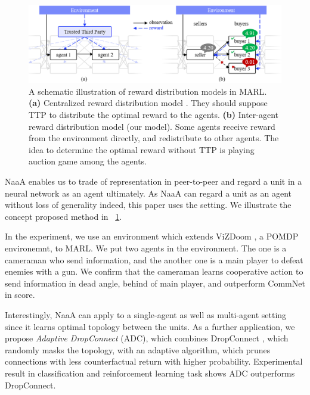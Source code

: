 \begin{figure}[tb]
	\centering
	\includegraphics[width=\linewidth]{img/TTP.eps}
	\caption{
		A schematic illustration of reward distribution models in MARL.
		{\bf (a)} Centralized reward distribution model \citep{agogino2006quicr,sukhbaatar2016learning,foerster2016learning,foerster2017counterfactual}. They should suppose TTP to distribute the optimal reward to the agents. %
		{\bf (b)} Inter-agent reward distribution model (our model). Some agents receive reward from the environment directly, and redistribute to other agents. The idea to determine the optimal reward without TTP is playing auction game among the agents.
	}
	\label{fig:ttp}
\end{figure}

NaaA enables us to trade of representation in peer-to-peer and regard a unit in a neural network as an agent ultimately.
As NaaA can regard a unit as an agent without loss of generality indeed, this paper uses the setting.
We illustrate the concept proposed method in \figurename~\ref{fig:ttp}.

In the experiment, we use an environment which extends ViZDoom \citep{kempka2016vizdoom}, a POMDP environemnt, to MARL.
We put two agents in the environment.
The one is a cameraman who send information, and the another one is a main player to defeat enemies with a gun.
We confirm that the cameraman learns cooperative action to send information in dead angle, behind of main player, and outperform CommNet in score.

Interestingly, NaaA can apply to a single-agent as well as multi-agent setting since it learns optimal topology between the units. %
As a further application, we propose {\em Adaptive DropConnect} (ADC), which combines DropConnect \citep{wan2013regularization}, which randomly masks the topology, with an adaptive algorithm, which prunes connections with less counterfactual return with higher probability.
Experimental result in classification and reinforcement learning task shows ADC outperforms DropConnect.

